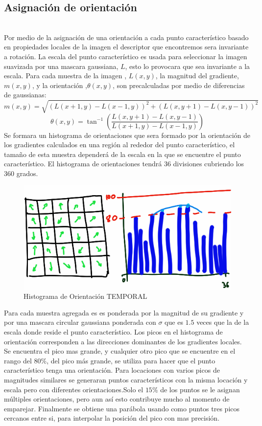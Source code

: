 	\subsection{Asignación de orientación} \hfill \\
		Por medio de la asignación de una orientación a cada punto característico basado en propiedades locales de la imagen el descriptor que encontremos sera invariante a rotación. La escala del punto característico es usada para seleccionar la imagen suavizada por una mascara gaussiana, $L$, esto lo provocara que sea invariante a la escala. Para cada muestra de la imagen , $L(x,y)$, la magnitud del gradiente, $m(x,y)$, y la orientación ,$\theta(x,y)$, son precalculadas por medio de diferencias de gaussianas:
  		$$m(x,y) = \sqrt{ (L(x+1,y)-L(x-1,y))^2 + (L(x,y+1)-L(x,y-1))^2 }$$		
		$$\theta(x,y) =  \tan^{-1} \left(\frac{L(x,y+1)-L(x,y-1)}{L(x+1,y)-L(x-1,y)}\right)$$
		Se formara un histograma de orientaciones que sera formado por la orientación de los gradientes calculados en una región al rededor del punto característico, el tamaño de esta muestra dependerá de la escala en la que se encuentre el punto característico. El histograma de orientaciones tendrá 36 divisiones cubriendo los 360 grados.
		\begin{figure}[t]
			\centering
				\includegraphics[scale=0.5]{img/HistoOrientacion.png}
			\caption{Histograma de Orientación TEMPORAL}
		\end{figure}
		Para cada muestra agregada es es ponderada por la magnitud de su gradiente y por una mascara circular gaussiana ponderada con $\sigma$ que es $1.5$ veces que la de la escala donde reside el punto característico.
		Los picos en el histograma de orientación corresponden a las direcciones dominantes de los gradientes locales. Se encuentra el pico mas grande, y cualquier otro pico que se encuentre en el rango del $80\%$, del pico más grande, se utiliza para hacer que el punto característico tenga una orientación. Para locaciones con varios picos de magnitudes similares se generaran puntos característicos con la misma locación y escala pero con diferentes orientaciones.Solo el $15\%$ de los puntos se le asignan múltiples orientaciones, pero aun así esto contribuye mucho al momento de emparejar. Finalmente se obtiene una parábola usando como puntos tres picos cercanos entre si, para interpolar la posición del pico con mas precisión.  
	

